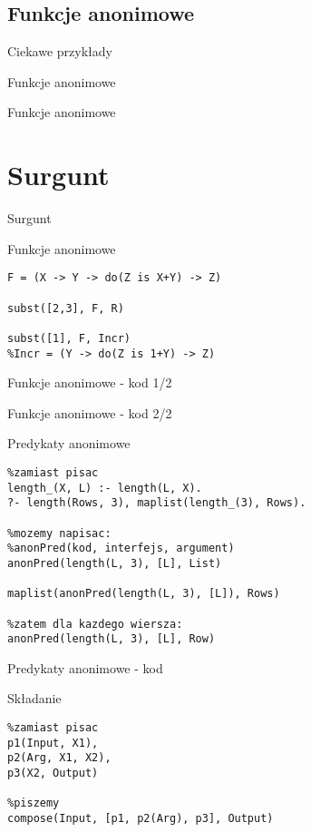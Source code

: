 \documentclass[blue]{beamer}
\newcommand{\tytul}[1]{\begin{frame}\begin{center}\begin{Huge}#1\end{Huge}\end{center}\end{frame}}
\newcommand{\tytulprz}[2]{\begin{frame}\begin{center}\begin{Huge}Ciekawe przykłady\end{Huge}

\hspace{20pt}

\begin{huge}#1\end{huge}

\hspace{10pt}

\begin{large}#2\end{large}\end{center}\end{frame}}
\begin{document}
\subsection{Funkcje anonimowe}
\tytulprz{Funkcje anonimowe}{}
\begin{frame}{Funkcje anonimowe}

\end{frame}
\section{Surgunt}
\tytul{Surgunt}
\begin{frame}[fragile]{Funkcje anonimowe}
\begin{lstlisting}
F = (X -> Y -> do(Z is X+Y) -> Z)

subst([2,3], F, R)

subst([1], F, Incr)
%Incr = (Y -> do(Z is 1+Y) -> Z)
\end{lstlisting}
\end{frame}
\begin{frame}{Funkcje anonimowe - kod 1/2}

\end{frame}
\begin{frame}{Funkcje anonimowe - kod 2/2}

\end{frame}
\begin{frame}[fragile]{Predykaty anonimowe}
\begin{lstlisting}
%zamiast pisac
length_(X, L) :- length(L, X).
?- length(Rows, 3), maplist(length_(3), Rows).

%mozemy napisac:
%anonPred(kod, interfejs, argument)
anonPred(length(L, 3), [L], List)

maplist(anonPred(length(L, 3), [L]), Rows)

%zatem dla kazdego wiersza:
anonPred(length(L, 3), [L], Row)
\end{lstlisting}
\end{frame}
\begin{frame}{Predykaty anonimowe - kod}

\end{frame}
\begin{frame}[fragile]{Składanie}
\begin{lstlisting}
%zamiast pisac
p1(Input, X1),
p2(Arg, X1, X2),
p3(X2, Output)

%piszemy
compose(Input, [p1, p2(Arg), p3], Output)
\end{lstlisting}
\end{frame}
\end{document}
